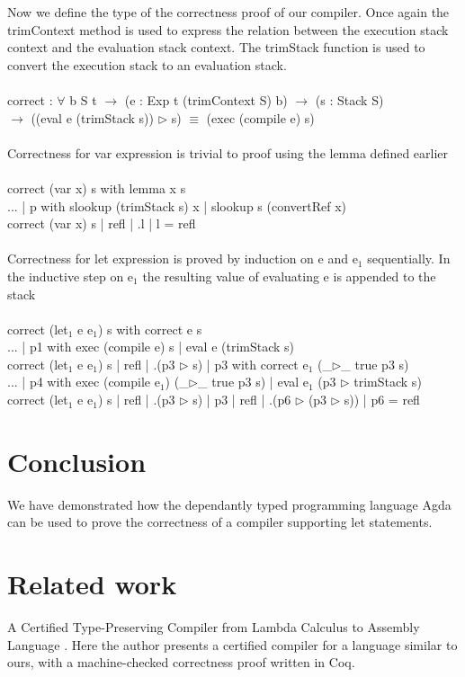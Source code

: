 \documentclass[paper=a4, fontsize=11pt]{scrartcl} %
\numberwithin{equation}{section} %
\numberwithin{figure}{section} %
\numberwithin{table}{section} %
\begin{document}
\normalfont
Now we define the type of the correctness proof of our compiler. Once again the \ttfamily trimContext \normalfont method is used to express the relation between the execution stack context and the evaluation stack context. The trimStack function is used to convert the execution stack to an evaluation stack.\\
\ttfamily
\\
correct : $\forall$ {b S t} $\rightarrow$ (e : Exp t (trimContext S) b) $\rightarrow$ (s : Stack S)\\\hspace*{36mm} $\rightarrow$ ((eval e (trimStack s)) $\rhd$ s) $\equiv$ (exec (compile e) s)\\
\normalfont
\\Correctness for var expression is trivial to proof using the lemma defined earlier\\
\ttfamily
\\
correct (var x) s with lemma x s\\
... | p with slookup (trimStack s) x | slookup s (convertRef x) \\
correct (var x) s | refl | .l | l = refl\\
\normalfont
\\Correctness for let expression is proved by induction on e and e$_1$ sequentially. In the inductive step on e$_1$ the resulting value of evaluating e is appended to the stack\\
\ttfamily
\\
correct (let$_1$ e e$_1$) s with correct e s\\
... | p1 with exec (compile e) s | eval e (trimStack s)\\
correct (let$_1$ e e$_1$) s | refl | .(p3 $\rhd$ s) | p3 with correct e$_1$ (\_$\rhd$\_ {true} p3 s)\\
... | p4 with exec (compile e$_1$) (\_$\rhd$\_ {true} p3 s) | eval e$_1$ (p3 $\rhd$ trimStack s)\\
correct (let$_1$ e e$_1$) s | refl | .(p3 $\rhd$ s) | p3 | refl | .(p6 $\rhd$ (p3 $\rhd$ s)) | p6 = refl\\
\normalfont
\section{Conclusion}
We have demonstrated how the dependantly typed programming language Agda can be used to prove the correctness of a compiler supporting \ttfamily let \normalfont statements.
\section{Related work} %
A Certified Type-Preserving Compiler from Lambda Calculus to
Assembly Language \cite{Chlipala}. Here the author presents a certified compiler for a language similar to ours, with a machine-checked correctness proof written in Coq.
\end{document}
